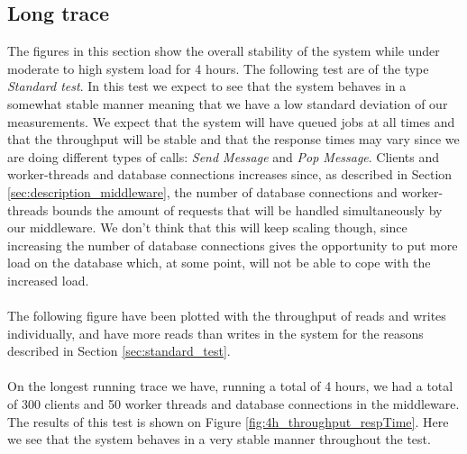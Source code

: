 \documentclass{article}
\begin{document}

        \subsection{Long trace}
            The figures in this section show the overall stability of the system while under moderate to high system load for 4 hours. The following test are of the type \textit{Standard test}. In this test we expect to see that the system behaves in a somewhat stable manner meaning that we have a low standard deviation of our measurements. We expect that the system will have queued jobs at all times and that the throughput will be stable and that the response times may vary since we are doing different types of calls: \textit{Send Message} and \textit{Pop Message}. Clients and worker-threads and database connections increases since, as described in Section \ref{sec:description_middleware}, the number of database connections and worker-threads bounds the amount of requests that will be handled simultaneously by our middleware. We don't think that this will keep scaling though, since increasing the number of database connections gives the opportunity to put more load on the database which, at some point, will not be able to cope with the increased load.\\
            \\
            The following figure have been plotted with the throughput of reads and writes individually, and have more reads than writes in the system for the reasons described in Section \ref{sec:standard_test}.\\
            \\
            On the longest running trace we have, running a total of 4 hours, we had a total of 300 clients and 50 worker threads and database connections in the middleware. The results of this test is shown on Figure \ref{fig:4h_throughput_respTime}. Here we see that the system behaves in a very stable manner throughout the test.
\end{document}
